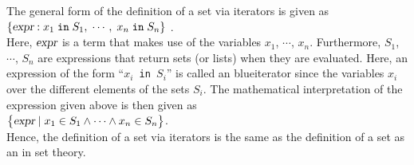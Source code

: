 The general form of the definition of a set via iterators is given as
\\[0.2cm]
\hspace*{1.3cm} 
$\{ \textsl{expr} : x_1 \;\mathtt{in}\; S_1,\; \cdots,\; x_n \;\mathtt{in}\; S_n \}$ .
\\[0.2cm]
Here,  $\textsl{expr}$ is a term that makes use of the variables $x_1$, $\cdots$, $x_n$.  Furthermore,
$S_1$, $\cdots$, $S_n$ are expressions that return sets (or lists) when they are evaluated.
Here, an expression of the form ``\texttt{$x_i$ in $S_i$}'' is called an  blue{iterator} since
the variables $x_i$  over the different elements of the sets $S_i$.
The mathematical interpretation of the expression given above is then given as
\\[0.2cm]
\hspace*{1.3cm} 
$\bigl\{ \textsl{expr} \mid x_1 \in S_1 \wedge \cdots \wedge x_n \in S_n \bigr\}$.
\\[0.2cm]
Hence, the definition of a set via iterators is the same as the definition of a set as an 
in set theory.  

